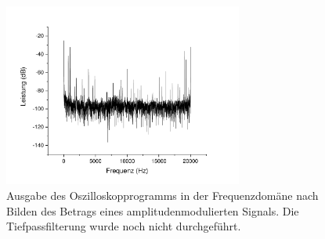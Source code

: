 \documentclass[
a4paper,
12pt,
pagesize,
ngerman
]{scrartcl}
\begin{document}
	\begin{figure}[H]  
		\includegraphics[width=0.7\textwidth]{Origin-Files/AM-Demod-Betrag-preTP}
		\centering
		\caption{Ausgabe des Oszilloskopprogramms in der Frequenzdomäne nach Bilden des Betrags eines amplitudenmodulierten Signals. Die Tiefpassfilterung wurde noch nicht durchgeführt.
		}
		\label{fig_tag3_am_demod_betrag_preTP}
		\centering
	\end{figure}
\end{document}
